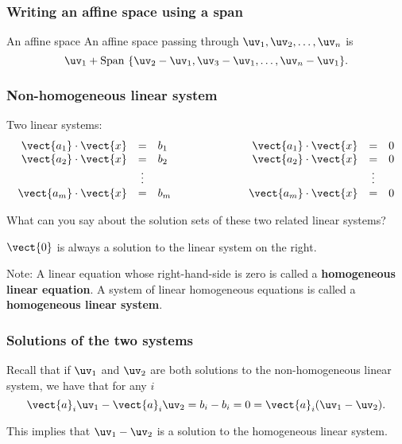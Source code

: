 \begin{frame}
  \frametitle{Writing an affine space using a span}
  \pause

  \begin{block}{An affine space}
    An affine space passing through $\uv_1,\uv_2,\ldots,\uv_n$ is
    \[
    \uv_1 + \mathrm{Span}\ \{\uv_2-\uv_1,\uv_3-\uv_1,\ldots,\uv_n-\uv_1\}.
    \]
  \end{block}
\end{frame}

\begin{frame}
  \frametitle{Non-homogeneous linear system}
  Two linear systems:
  \[
  \begin{array}{rcl}
    \vect{a_1}\cdot\vect{x} &=& b_1 \\
    \vect{a_2}\cdot\vect{x} &=& b_2 \\
    &\vdots&\\
    \vect{a_m}\cdot\vect{x} &=& b_m
  \end{array}
  \ \ \ \ \ \ \ \ \ \ \ \ \ \ \ \ \ \ 
  \begin{array}{rcl}
    \vect{a_1}\cdot\vect{x} &=& 0 \\
    \vect{a_2}\cdot\vect{x} &=& 0 \\
    &\vdots&\\
    \vect{a_m}\cdot\vect{x} &=& 0
  \end{array}
  \]

  What can you say about the solution sets of these two related linear
  systems?

  \pause

  $\vect{0}$ is always a solution to the linear system on the right.

  
  Note: A linear equation whose right-hand-side is zero is called a
  {\bf homogeneous linear equation}.  A system of linear homogeneous
  equations is called a {\bf homogeneous linear system}.
\end{frame}

\begin{frame}
  \frametitle{Solutions of the two systems}

  Recall that if $\uv_1$ and $\uv_2$ are both solutions to the
  non-homogeneous linear system, we have that for any $i$
  \[
  \vect{a}_i \uv_1 - \vect{a}_i \uv_2
  = b_i - b_i = 0 = \vect{a}_i (\uv_1 - \uv_2).
  \]
  \pause

  This implies that $\uv_1-\uv_2$ is a solution to the homogeneous
  linear system.
\end{frame}


